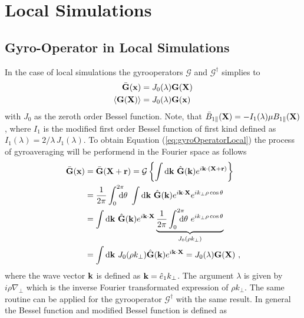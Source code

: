 \section{Local Simulations}
\label{sec:localSimulation}

\subsection{Gyro-Operator in Local Simulations}
\label{sub:gyroOperatorLocal}

In the case of local simulations the gyrooperators $\mathcal{G}$ and $\mathcal{G}^\dagger$ simplies to
\begin{gather}
    \begin{aligned}
        \bar{\boldsymbol{\mathbf{G}}}(\boldsymbol{\mathbf{x}}) &= J_0(\lambda) \boldsymbol{\mathbf{G}}(\boldsymbol{\mathbf{X}}) \\
        \langle\boldsymbol{\mathbf{G}}(\boldsymbol{\mathbf{X}})\rangle &= J_0(\lambda) \boldsymbol{\mathbf{G}}(\boldsymbol{\mathbf{x}})
    \end{aligned}
    \label{eq:gyroOperatorLocal}
\end{gather}
with $J_0$ as the zeroth order Bessel function. Note, that $\bar{B}_{1\parallel}(\boldsymbol{\mathbf{X}}) = - I_1(\lambda)\mu B_{1\parallel} (\boldsymbol{\mathbf{X}})$, where $I_1$ is the modified first order Bessel function of first kind defined as $I_1(\lambda) = 2/\lambda \, J_1(\lambda)$. To obtain Equation (\ref{eq:gyroOperatorLocal}) the process of gyroaveraging will be performend in the Fourier space as follows
\begin{gather}
    \begin{aligned}
        \ga{\vect{G}}(\x) &= \ga{\vect{G}}(\X + \vect{r}) = \tga{\left\{\int \mathrm{d}\vect{k} ~ \hat{\vect{G}}(\vect{k}) e^{i \vect{k} \cdot (\X + \vect{r})} \right\}} \\
                          &= \frac{1}{2\pi} \intss{0}{2\pi} \dtheta ~ \int \mathrm{d}\vect{k} ~ \hat{\vect{G}}(\vect{k}) e^{i \vect{k} \cdot \X} e^{ i k_\perp \rho \cos \theta} \\
                          &= \int \mathrm{d}\vect{k} ~ \hat{\vect{G}}(\vect{k}) e^{i \vect{k} \cdot \X} \underbrace{\frac{1}{2\pi} \intss{0}{2\pi} \dtheta ~ e^{ i k_\perp \rho \cos \theta}}_{J_0(\rho k_\perp)}\\
                          &= \int \mathrm{d}\vect{k} ~ J_0(\rho k_\perp) \hat{\vect{G}}(\vect{k}) e^{i \vect{k} \cdot \X} = J_0(\lambda) \vect{G}(\X)~,
    \end{aligned}
    \label{eq:gyroOperatorLocalDerivation}
\end{gather}
where the wave vector $\boldsymbol{\mathbf{k}}$ is defined as $\boldsymbol{\mathbf{k}} = \hat{e}_1 k_\perp$. The argument $\lambda$ is given by $i \rho \nabla_{\!\perp}$ which is the inverse Fourier transformated expression of $\rho k_\perp$. The same routine can be applied for the gyrooperator $\mathcal{G}^\dagger$ with the same result. In general the Bessel function and modified Bessel function is defined as \cite{Dannert_PHD}
